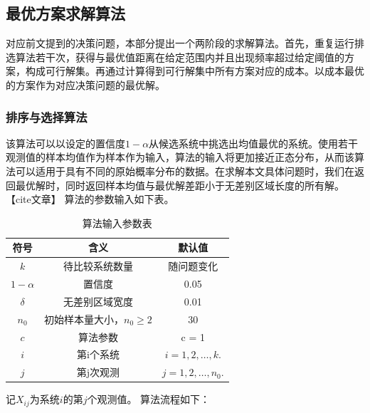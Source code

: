 \documentclass{article}
\begin{document}
\subsection{最优方案求解算法}
对应前文提到的决策问题，本部分提出一个两阶段的求解算法。首先，重复运行排选算法若干次，获得与最优值距离在给定范围内并且出现频率超过给定阈值的方案，构成可行解集。再通过计算得到可行解集中所有方案对应的成本。以成本最优的方案作为对应决策问题的最优解。
\subsubsection{排序与选择算法}
该算法可以以设定的置信度$1-\alpha$从候选系统中挑选出均值最优的系统。使用若干观测值的样本均值作为样本作为输入，算法的输入将更加接近正态分布，从而该算法可以适用于具有不同的原始概率分布的数据。在求解本文具体问题时，我们在返回最优解时，同时返回样本均值与最优解差距小于无差别区域长度的所有解。【cite文章】
算法的参数输入如下表。
\begin{table}[H]
    \centering
    \caption{算法输入参数表}
    \begin{tabular}{ |c|c|c| } 
     \hline
     符号 & 含义 & 默认值\\ 
     \hline
     $ k $ & 待比较系统数量 & 随问题变化\\ 
     \hline
     $ 1-\alpha $ & 置信度 & 0.05 \\ 
     \hline
     $ \delta $ & 无差别区域宽度 & 0.01\\ 
     \hline
     $ n_0 $ & 初始样本量大小，$ n_0 \geq 2 $ & 30 \\ 
     \hline
     $ c $ & 算法参数 & c = 1 \\ 
     \hline
     $ i $ & 第i个系统 & $ i = 1, 2, \dots, k. $ \\ 
     \hline
     $ j $ & 第j次观测 & $ j = 1, 2, \dots, n_0. $ \\ 
     \hline
    \end{tabular}
    \label{tablerv}
\end{table}
记$X_{ij}$为系统$i$的第$j$个观测值。
算法流程如下：
\end{document}
